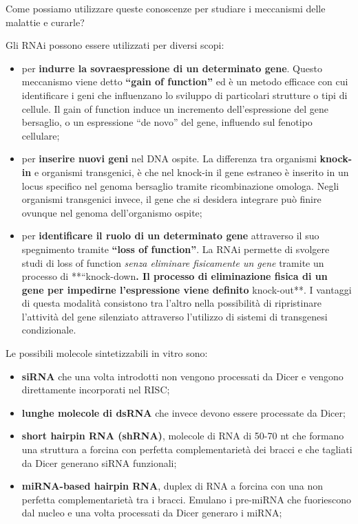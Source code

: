 \documentclass[]{article}
\begin{document}
Come possiamo utilizzare queste conoscenze per studiare i meccanismi
delle malattie e curarle?

Gli RNAi possono essere utilizzati per diversi scopi:

\begin{itemize}
\itemsep1pt\parskip0pt
\item
  per \textbf{indurre la sovraespressione di un determinato gene}.
  Questo meccanismo viene detto \textbf{``gain of function''} ed è un
  metodo efficace con cui identificare i geni che influenzano lo
  sviluppo di particolari strutture o tipi di cellule. Il gain of
  function induce un incremento dell'espressione del gene bersaglio, o
  un espressione ``de novo'' del gene, influendo sul fenotipo cellulare;
\item
  per \textbf{inserire nuovi geni} nel DNA ospite. La differenza tra
  organismi \textbf{knock-in} e organismi transgenici, è che nel
  knock-in il gene estraneo è inserito in un locus specifico nel genoma
  bersaglio tramite ricombinazione omologa. Negli organismi transgenici
  invece, il gene che si desidera integrare può finire ovunque nel
  genoma dell'organismo ospite;
\item
  per \textbf{identificare il ruolo di un determinato gene} attraverso
  il suo spegnimento tramite \textbf{``loss of function''}. La RNAi
  permette di svolgere studi di loss of function \emph{senza eliminare
  fisicamente un gene} tramite un processo di **``knock-down\textbf{. Il
  processo di eliminazione fisica di un gene per impedirne l'espressione
  viene definito }knock-out**. I vantaggi di questa modalità consistono
  tra l'altro nella possibilità di ripristinare l'attività del gene
  silenziato attraverso l'utilizzo di sistemi di transgenesi
  condizionale.
\end{itemize}

Le possibili molecole sintetizzabili in vitro sono:

\begin{itemize}
\itemsep1pt\parskip0pt
\item
  \textbf{siRNA} che una volta introdotti non vengono processati da
  Dicer e vengono direttamente incorporati nel RISC;
\item
  \textbf{lunghe molecole di dsRNA} che invece devono essere processate
  da Dicer;
\item
  \textbf{short hairpin RNA (shRNA)}, molecole di RNA di 50-70 nt che
  formano una struttura a forcina con perfetta complementarietà dei
  bracci e che tagliati da Dicer generano siRNA funzionali;
\item
  \textbf{miRNA-based hairpin RNA}, duplex di RNA a forcina con una non
  perfetta complementarietà tra i bracci. Emulano i pre-miRNA che
  fuoriescono dal nucleo e una volta processati da Dicer generaro i
  miRNA;
\end{itemize}
\end{document}
